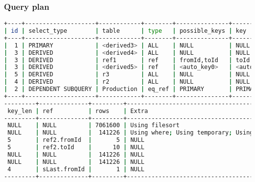 \subsubsection{Query plan}
\begin{lstlisting}[language=bash]
+----+--------------------+------------+--------+---------------+-------------+
| id | select_type        | table      | type   | possible_keys | key         |
+----+--------------------+------------+--------+---------------+-------------+
|  1 | PRIMARY            | <derived3> | ALL    | NULL          | NULL        |
|  3 | DERIVED            | <derived4> | ALL    | NULL          | NULL        |
|  3 | DERIVED            | ref1       | ref    | fromId,toId   | toId        |
|  3 | DERIVED            | <derived5> | ref    | <auto_key0>   | <auto_key0> |
|  5 | DERIVED            | r3         | ALL    | NULL          | NULL        |
|  4 | DERIVED            | r2         | ALL    | NULL          | NULL        |
|  2 | DEPENDENT SUBQUERY | Production | eq_ref | PRIMARY       | PRIMARY     |
+----+--------------------+------------+--------+---------------+-------------+
---------+--------------+---------+----------------------------------------------+
 key_len | ref          | rows    | Extra                                        |
---------+--------------+---------+----------------------------------------------+
 NULL    | NULL         | 7061600 | Using filesort                               |
 NULL    | NULL         |  141226 | Using where; Using temporary; Using filesort |
 5       | ref2.fromId  |       5 | NULL                                         |
 5       | ref2.toId    |      10 | NULL                                         |
 NULL    | NULL         |  141226 | NULL                                         |
 NULL    | NULL         |  141226 | NULL                                         |
 4       | sLast.fromId |       1 | NULL                                         |
---------+--------------+---------+----------------------------------------------+
\end{lstlisting}

